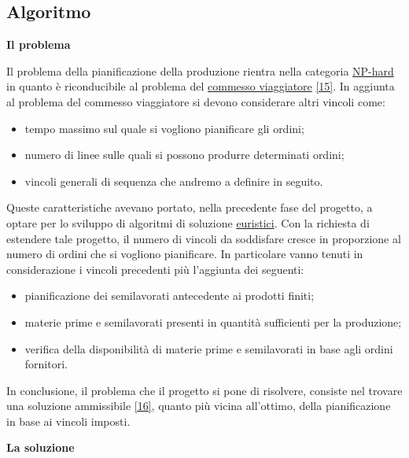 \subsection{Algoritmo}

\textbf{Il problema}

Il problema della pianificazione della produzione rientra nella categoria \hyperref[Np-hard]{NP-hard\glo} in quanto è riconducibile al problema del 
\hyperref[Commesso viaggiatore]{commesso viaggiatore\glo} \hyperref[slide]{[15]}. 
In aggiunta al problema del commesso viaggiatore si devono considerare
altri vincoli come: 
\begin{itemize}
    \item tempo massimo sul quale si vogliono pianificare gli ordini;
    \item numero di linee sulle quali si possono produrre determinati ordini;
    \item vincoli generali di sequenza che andremo a definire in seguito.
\end{itemize}

Queste caratteristiche avevano portato, nella precedente fase del progetto, a optare per lo sviluppo di algoritmi di soluzione \hyperref[slide]{euristici\glo [15]}.
Con la richiesta di estendere tale progetto, il numero di vincoli da soddisfare cresce in proporzione al numero di ordini che si vogliono pianificare.
In particolare vanno tenuti in considerazione i vincoli precedenti più l'aggiunta dei seguenti:

\begin{itemize}
    \item pianificazione dei semilavorati antecedente ai prodotti finiti;
    \item materie prime e semilavorati presenti in quantità sufficienti per la produzione;
    \item verifica della disponibilità di materie prime e semilavorati in base agli ordini fornitori.
\end{itemize}

In conclusione, il problema che il progetto si pone di risolvere, consiste nel trovare una soluzione ammissibile \hyperref[slide0]{[16]}, quanto più vicina all'ottimo,
della pianificazione
in base ai vincoli imposti.\newline

\noindent \textbf{La soluzione}

